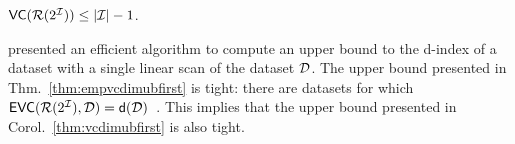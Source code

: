 

\begin{corollary}\label{thm:vcdimubfirst}
  $\mathsf{VC}(\mathcal{R}(2^{\cal I}))\le |{\cal I}|-1$.
\end{corollary}

\citet{RiondatoU12} presented an efficient algorithm to compute an upper bound to
the d-index of a dataset with a single linear scan of the dataset ${\cal D}$.
The upper bound presented in Thm.~\ref{thm:empvcdimubfirst} is tight:
 there are datasets for which
$\mathsf{EVC}(\mathcal{R}(2^{\cal I}),{\cal D})=\mathsf{d}({\cal D})$~\citep{RiondatoU12}.
This implies that the upper bound presented in Corol.~\ref{thm:vcdimubfirst} is
also tight.


